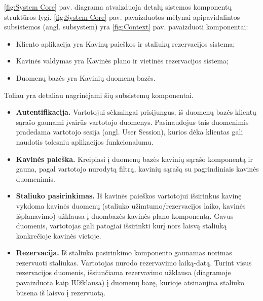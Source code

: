 \documentclass{VUMIFPSkursinis}
\begin{document}
\ref {fig:System Core} pav. diagrama atvaizduoja detalų sistemos komponentų struktūros lygį. \ref {fig:System Core} pav. pavaizduotos mėlynai apipavidalintos subsistemos (angl. subsystem) yra \ref {fig:Context} pav. pavaizduoti komponentai:
\begin{itemize}
  \item Kliento aplikacija yra Kavinų paieškos ir staliukų rezervacijos sistema;
  \item Kavinės valdymas yra Kavinės plano ir vietinės rezervacijos sistema;
  \item Duomenų bazės yra Kavinių duomenų bazės.
\end{itemize}
Toliau yra detaliau nagrinėjami šių subsistemų komponentai.\\

\begin{itemize}
  \item \textbf{Autentifikacija.} Vartotojui sėkmingai prisijungus, iš duomenų bazės klientų sąrašo gaunami įvairūs vartotojo duomenys. Pasinaudojus tais duomenimis pradedama vartotojo sesija (angl. User Session), kurios dėka klientas gali naudotis tolesniu aplikacijos funkcionalumu.
  \item \textbf{Kavinės paieška.} Kreipiasi į duomenų bazės kavinių sąrašo komponentą ir gauna, pagal vartotojo nurodytą filtrą, kavinių sąrašą su pagrindiniais kavinės duomenimis.
  \item \textbf{Staliuko pasirinkimas.} Iš kavinės paieškos vartotojui išsirinkus kavinę vykdoma kavinės duomenų (staliuko užimtumo/rezervacijos laiko, kavinės išplanavimo) užklausa į duombazės kavinės plano komponentą. Gavus duomenis, vartotojas gali patogiai išsirinkti kurį nors laisvą staliuką konkrečioje kavinės vietoje.
  \item \textbf{Rezervacija.} Iš staliuko pasirinkimo komponento gaunamas norimas rezervuoti staliukas. Vartotojas nurodo rezervavimo laiką-datą. Turint visus rezervacijos duomenis, išsiunčiama rezervavimo užklausa (diagramoje pavaizduota kaip IUžklausa) į duomenų bazę, kurioje atsinaujina staliuko būsena iš laisvo į rezervuotą.
\end{itemize}
\end{document}

